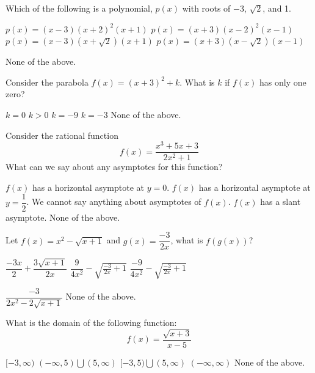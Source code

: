 \documentclass[addpoints,12pt]{exam}
\newcommand{\chooseone}{{\Large$\Circle$\ \ }}
\begin{document}
\begin{questions}
\question[3] Which of the following is a polynomial, $p(x)$ with roots of $-3$, $\sqrt{2}$, and 1.%
\begin{choices}
   \choice \chooseone $p(x)=(x-3)(x+2)^2(x+1)$
   \choice \chooseone $p(x)=(x+3)(x-2)^2(x-1)$
    \choice \chooseone $p(x)=(x-3)(x+\sqrt{2})(x+1)$
   \choice \chooseone $p(x)=(x+3)(x-\sqrt{2})(x-1)$

   \choice \chooseone None of the above.
\end{choices}

\question[3] 
Consider the parabola $f(x)=(x+3)^2+k$. What is $k$ if $f(x)$ has only one zero?
\begin{choices}
   \choice \chooseone $k=0$
   \choice \chooseone $k>0$
   \choice \chooseone $k=-9$
   \choice \chooseone $k=-3$
   \choice \chooseone None of the above.
\end{choices}

\newpage

\question[3] Consider the rational function 
\[
f(x)=\dfrac{x^3+5x+3}{2x^2+1}
\]
What can we say about any asymptotes for this function?
\begin{choices}
   \choice \chooseone $f(x)$ has a horizontal asymptote at $y=0$.
   \choice \chooseone $f(x)$ has a horizontal asymptote at $y=\dfrac{1}{2}$. 
   \choice \chooseone We cannot say anything about asymptotes of $f(x)$.
      \choice \chooseone $f(x)$ has a slant asymptote.
   \choice \chooseone None of the above.
\end{choices}

\question[3] Let $f(x)=x^2-\sqrt{x+1}$ and $g(x)=\dfrac{-3}{2x}$, what is $f(g(x))$?
\begin{choices}
   \choice \chooseone $\dfrac{-3x}{2}+\dfrac{3\sqrt{x+1}}{2x}$
      \choice \chooseone $\dfrac{9}{4x^2}-\sqrt{\frac{-3}{2x}+1}$
   \choice \chooseone $\dfrac{-9}{4x^2}-\sqrt{\frac{-3}{2x}+1}$

   \choice \chooseone $\dfrac{-3}{2x^2-2\sqrt{x+1}} $
   \choice \chooseone None of the above.
\end{choices}

\question[3] What is the domain of the following function:
\[
f(x)=\dfrac{\sqrt{x+3}}{x-5}
\]
\begin{choices}
   \choice \chooseone $[-3,\infty)$
   \choice \chooseone $(-\infty,5)\bigcup(5,\infty)$
   \choice \chooseone $[-3,5)\bigcup(5,\infty)$
   \choice \chooseone $(-\infty,\infty)$
   \choice \chooseone None of the above.
\end{choices}


\end{questions}
\end{document}
